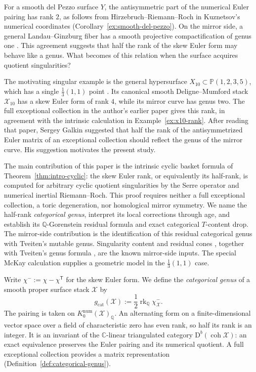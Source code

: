 \documentclass[11pt]{article}
\theoremstyle{plain}
\theoremstyle{definition}
\theoremstyle{remark}
\newcommand{\cX}{\mathcal X}
\newcommand{\Db}{\mathrm D^b}
\newcommand{\coh}{\operatorname{coh}}
\newcommand{\rk}{\operatorname{rk}}
\newcommand{\C}{\mathbb C}
\newcommand{\Q}{\mathbb Q}
\newcommand{\Pj}{\mathbb P}
\newcommand{\1}{\mathbf 1}
\begin{document}
For a smooth del Pezzo surface $Y$, the antisymmetric part of the numerical Euler pairing has rank $2$, as follows from Hirzebruch--Riemann--Roch in Kuznetsov's numerical coordinates \cite[Example 3.5]{Kuz} (Corollary~\ref{ex:smooth-del-pezzo}).  On the mirror side, a general Landau--Ginzburg fiber has a smooth projective compactification of genus one \cite{galkin2008delpezzo,AKO}.  This agreement suggests that half the rank of the skew Euler form may behave like a genus.  What becomes of this relation when the surface acquires quotient singularities?

The motivating singular example is the general hypersurface $X_{10}\subset\Pj(1,2,3,5)$, which has a single $\frac13(1,1)$ point \cite[Section 7.3, entry 11]{OP}.  Its canonical smooth Deligne--Mumford stack $\cX_{10}$ has a skew Euler form of rank $4$, while its mirror curve has genus two.  The full exceptional collection in the author's earlier paper \cite[Proposition 5.4]{GS} gives this rank, in agreement with the intrinsic calculation in Example~\ref{ex:x10-rank}.  After reading that paper, Sergey Galkin suggested that half the rank of the antisymmetrized Euler matrix of an exceptional collection should reflect the genus of the mirror curve.  His suggestion motivates the present study.

The main contribution of this paper is the intrinsic cyclic basket formula of Theorem~\ref{thm:intro-cyclic}: the skew Euler rank, or equivalently its half-rank, is computed for arbitrary cyclic quotient singularities by the Serre operator and numerical inertial Riemann--Roch.  This proof requires neither a full exceptional collection, a toric degeneration, nor homological mirror symmetry.  We name the half-rank \emph{categorical genus}, interpret its local corrections through age, and establish its $\Q$-Gorenstein residual formula and exact categorical $T$-content drop.  The mirror-side contribution is the identification of this residual categorical genus with Tveiten's mutable genus.  Singularity content and residual cones \cite{AkhtarKasprzyk}, together with Tveiten's genus formula \cite[Theorem 3.13]{Tveiten}, are the known mirror-side inputs.  The special McKay calculation supplies a geometric model in the $\frac13(1,1)$ case.

Write $\chi^-:=\chi-\chi^{\mathsf T}$ for the skew Euler form.  We define the \emph{categorical genus} of a smooth proper surface stack $\mathcal X$ by
\[
g_{\mathrm{cat}}(\mathcal X)
:=\frac12\rk_{\Q}\chi^-_{\mathcal X}.
\]
The pairing is taken on $K_0^{\mathrm{num}}(\mathcal X)_{\Q}$.  An alternating form on a finite-dimensional vector space over a field of characteristic zero has even rank, so half its rank is an integer.  It is an invariant of the $\C$-linear triangulated category $\Db(\coh\mathcal X)$: an exact equivalence preserves the Euler pairing and its numerical quotient.  A full exceptional collection provides a matrix representation (Definition~\ref{def:categorical-genus}).
\end{document}
